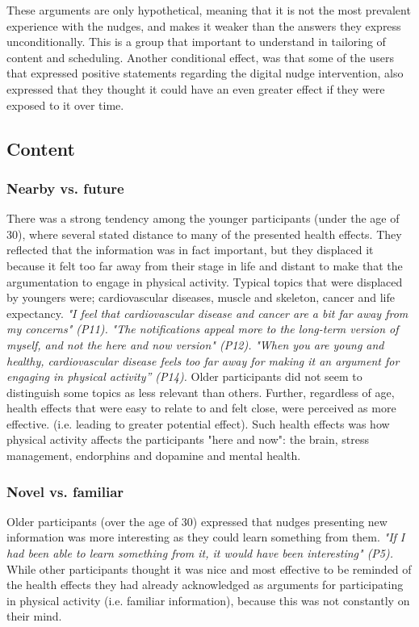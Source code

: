 These arguments are only hypothetical, meaning that it is not the most prevalent experience with the nudges, and makes it weaker than the answers they express unconditionally. This is a group that important to understand in tailoring of content and scheduling. Another conditional effect, was that some of the users that expressed positive statements regarding the digital nudge intervention, also expressed that they thought it could have an even greater effect if they were exposed to it over time.

\subsection{Content}
\subsubsection{Nearby vs. future}
There was a strong tendency among the younger participants (under the age of 30), where several stated distance to many of the presented health effects. They reflected that the information was in fact important, but they displaced it because it felt too far away from their stage in life and distant to make that the argumentation to engage in physical activity. Typical topics that were displaced by youngers were; cardiovascular diseases, muscle and skeleton, cancer and life expectancy. 
\textit{"I feel that cardiovascular disease and cancer are a bit far away from my concerns" (P11).}
\textit{"The notifications appeal more to the long-term version of myself, and not the here and now version" (P12).}
\textit{"When you are young and healthy, cardiovascular disease feels too far away for making it an argument for engaging in physical activity” (P14).} 
Older participants did not seem to distinguish some topics as less relevant than others. Further, regardless of age, health effects that were easy to relate to and felt close, were perceived as more effective. (i.e. leading to greater potential effect). Such health effects was how physical activity affects the participants "here and now": the brain, stress management, endorphins and dopamine and mental health. 

\subsubsection{Novel vs. familiar}
Older participants (over the age of 30) expressed that nudges presenting new information was more interesting as they could learn something from them. \textit{"If I had been able to learn something from it, it would have been interesting" (P5).} While other participants thought it was nice and most effective to be reminded of the health effects they had already acknowledged as arguments for participating in physical activity (i.e. familiar information), because this was not constantly on their mind. 

